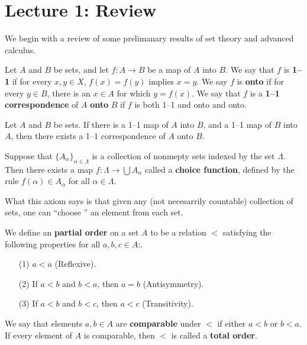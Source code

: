 \section*{Lecture 1: Review}

We begin with a review of some prelimanary results of set theory and advanced
calculus.

\begin{definition}
    Let $A$ and $B$ be sets, and let $f:A \rightarrow B$ be a map of $A$ into
   $B$. We say that $f$ is  \textbf{1--1} if for every  $x,y \in X$,  $f(x)=f(y)$
   implies $x=y$. We say $f$ is \textbf{onto} if for every $y \in B$, there is
   an  $x \in A$ for which $y=f(x)$. We say that $f$ is a  \textbf{1--1
   correspondence} of $A$  \textbf{onto} $B$ if  $f$ is both 1--1 and onto and
   onto.
\end{definition}

\begin{theorem}\label{thm_1}
    Let $A$ and  $B$ be sets. If there is a 1--1 map of $A$ into  $B$, and a
    1--1 map of  $B$ into $A$, then there exists a 1--1 correspondence of
    $A$ onto  $B$.
\end{theorem}

\begin{axiom}\label{axm_1}
    Suppose that $\{A_\alpha\}_{\alpha \in \Lambda}$ is a collection of nonmepty
    sets indexed by the set $\Lambda$. Then there exists a map $f:\Lambda
    \rightarrow \bigcup{A_\alpha}$ called a \textbf{choice function}, defined by
    the rule $f(\alpha) \in A_\alpha$ for all $\alpha \in \Lambda$.
\end{axiom}
\begin{remark}
    What this axiom says is that given any (not necesarrily countable)
    collection of sets, one can ``choose '' an element from each set.
\end{remark}

\begin{definition}
    We define an \textbf{partial order} on a set $A$ to be a relation $<$
    satisfying the following properties for all $a,b,c \in A$:.
    \begin{enumerate}
        \item[(1)] $a<a$  (Reflexive).

        \item[(2)] If $a<b$ and  $b<a$, then  $a=b$  (Antisymmetry).

        \item[(3)] If $a<b$ and  $b<c$, then  $a<c$  (Transitivity).
    \end{enumerate}
     We say that elements $a,b \in A$ are \textbf{comparable} under $<$ if
     either $a<b$ or $b<a$. If every element of $A$ is comparable, then  $<$ is
     called a  \textbf{total order}.
\end{definition}


